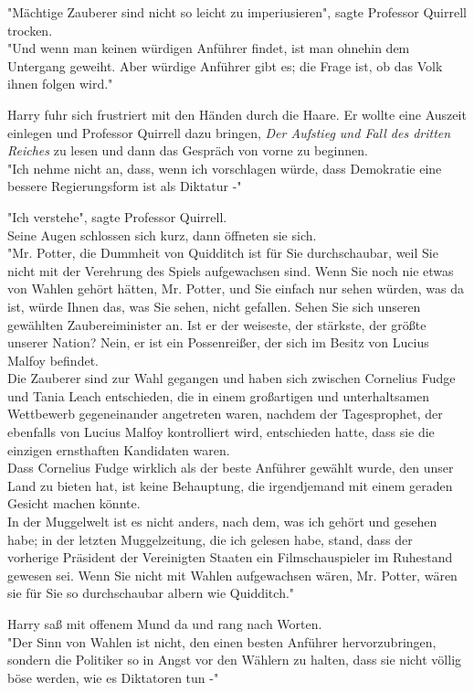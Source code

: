 {"Mächtige Zauberer sind nicht so leicht zu imperiusieren", sagte Professor Quirrell trocken.\\ "Und wenn man keinen würdigen Anführer findet, ist man ohnehin dem Untergang geweiht. Aber würdige Anführer gibt es; die Frage ist, ob das Volk ihnen folgen wird."

Harry fuhr sich frustriert mit den Händen durch die Haare. Er wollte eine Auszeit einlegen und Professor Quirrell dazu bringen, \emph{Der Aufstieg und Fall des dritten Reiches} zu lesen und dann das Gespräch von vorne zu beginnen.\\ "Ich nehme nicht an, dass, wenn ich vorschlagen würde, dass Demokratie eine bessere Regierungsform ist als Diktatur -"

"Ich verstehe", sagte Professor Quirrell.\\ Seine Augen schlossen sich kurz, dann öffneten sie sich.\\ "Mr. Potter, die Dummheit von Quidditch ist für Sie durchschaubar, weil Sie nicht mit der Verehrung des Spiels aufgewachsen sind. Wenn Sie noch nie etwas von Wahlen gehört hätten, Mr. Potter, und Sie einfach nur sehen würden, was da ist, würde Ihnen das, was Sie sehen, nicht gefallen. Sehen Sie sich unseren gewählten Zaubereiminister an. Ist er der weiseste, der stärkste, der größte unserer Nation? Nein, er ist ein Possenreißer, der sich im Besitz von Lucius Malfoy befindet.\\ Die Zauberer sind zur Wahl gegangen und haben sich zwischen Cornelius Fudge und Tania Leach entschieden, die in einem großartigen und unterhaltsamen Wettbewerb gegeneinander angetreten waren, nachdem der Tagesprophet, der ebenfalls von Lucius Malfoy kontrolliert wird, entschieden hatte, dass sie die einzigen ernsthaften Kandidaten waren.\\ Dass Cornelius Fudge wirklich als der beste Anführer gewählt wurde, den unser Land zu bieten hat, ist keine Behauptung, die irgendjemand mit einem geraden Gesicht machen könnte.\\ In der Muggelwelt ist es nicht anders, nach dem, was ich gehört und gesehen habe; in der letzten Muggelzeitung, die ich gelesen habe, stand, dass der vorherige Präsident der Vereinigten Staaten ein Filmschauspieler im Ruhestand gewesen sei. Wenn Sie nicht mit Wahlen aufgewachsen wären, Mr. Potter, wären sie für Sie so durchschaubar albern wie Quidditch."

Harry saß mit offenem Mund da und rang nach Worten.\\ "Der Sinn von Wahlen ist nicht, den einen besten Anführer hervorzubringen, sondern die Politiker so in Angst vor den Wählern zu halten, dass sie nicht völlig böse werden, wie es Diktatoren tun -"

}
